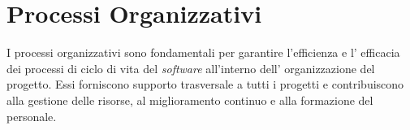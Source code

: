 \section{Processi Organizzativi}
\label{sec:processi_organizzativi}

I processi organizzativi sono fondamentali per garantire l'efficienza e l'
efficacia dei processi di ciclo di vita del \textit{software} all'interno dell'
organizzazione del progetto. Essi forniscono supporto trasversale a tutti i
progetti e contribuiscono alla gestione delle risorse, al miglioramento
continuo e alla formazione del personale.





